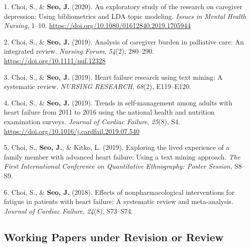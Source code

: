 \documentclass[11pt,a4paper,]{awesome-cv}
\newlength{\cslhangindent}
\newenvironment{CSLReferences}[2] %
 {\begin{list}{}{%
  \setlength{\itemindent}{0pt}
  \setlength{\leftmargin}{0pt}
  \setlength{\parsep}{0pt}
  \ifodd #1
   \setlength{\leftmargin}{\cslhangindent}
   \setlength{\itemindent}{-1\cslhangindent}
  \fi
  \setlength{\itemsep}{#2\baselineskip}}}
 {\end{list}}
\begin{document}
\label{refs-d735fc8e424a60effc95b6b86f680502}
\begin{CSLReferences}{1}{0}
1. Choi, S., \& \textbf{Seo, J.} (2020). An exploratory study of the
research on caregiver depression: Using bibliometrics and LDA topic
modeling. \emph{Issues in Mental Health Nursing}, 1--10.
\url{https://doi.org/10.1080/01612840.2019.1705944}

2. Choi, S., \& \textbf{Seo, J.} (2019). Analysis of caregiver burden in
palliative care: An integrated review. \emph{Nursing Forum},
\emph{54}(2), 280--290. \url{https://doi.org/10.1111/nuf.12328}

3. Choi, S., \& \textbf{Seo, J.} (2019). Heart failure research using
text mining: A systematic review. \emph{NURSING RESEARCH}, \emph{68}(2),
E119--E120.

4. Choi, S., \& \textbf{Seo, J.} (2019). Trends in self-management among
adults with heart failure from 2011 to 2016 using the national health
and nutrition examination surveys. \emph{Journal of Cardiac Failure},
\emph{25}(8), S4. \url{https://doi.org/10.1016/j.cardfail.2019.07.540}

5. Choi, S., \textbf{Seo, J.}, \& Kitko, L. (2019). Exploring the lived
experience of a family member with advanced heart failure: Using a text
mining approach. \emph{The First International Conference on
Quantitative Ethnography: Poster Session}, S8--S9.

6. Choi, S., \& \textbf{Seo, J.} (2018). Effects of nonpharmacological
interventions for fatigue in patients with heart failure: A systematic
review and meta-analysis. \emph{Journal of Cardiac Failure},
\emph{24}(8), S73--S74.

\end{CSLReferences}

\subsection{Working Papers under Revision or
Review}\label{working-papers-under-revision-or-review}
\end{document}
